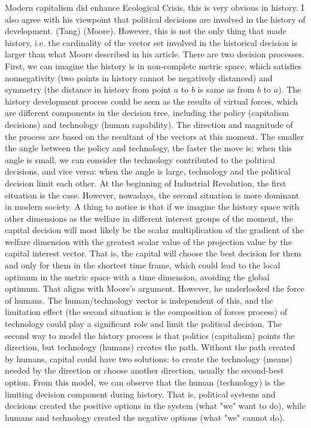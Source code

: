 \documentclass[12pt]{article}
\newcommand{\IR}{Industrial Revolution}
\newcommand{\EC}{Ecological Crisis}
\begin{document}
\begin{flushleft}
Modern capitalism did enhance \EC, this is very obvious in history. I also agree with his viewpoint that political decisions are involved in the history of development. (Tang) (Moore). However, this is not the only thing that made history, i.e. the cardinality of the vector set involved in the historical decision is larger than what Moore described in his article. There are two decision processes. First, we can imagine the history is in non-complete metric space, which satisfies nonnegativity (two points in history cannot be negatively distanced) and symmetry (the distance in history from point $a$ to $b$ is same as from $b$ to $a$).
The history development process could be seen as the results of virtual forces, which are different components in the decision tree, including the policy (capitalism decisions) and technology (human capability). The direction and magnitude of the process are based on the resultant of the vectors at this moment. The smaller the angle between the policy and technology, the faster the move is; when this angle is small, we can consider the technology contributed to the political decisions, and vice versa: when the angle is large, technology and the political decision limit each other.  At the beginning of \IR, the first situation is the case. However, nowadays, the second situation is more dominant in modern society. A thing to notice is that if we imagine the history space with other dimensions as the welfare in different interest groups of the moment, the capital decision will most likely be the scalar multiplication of the gradient of the welfare dimension with the greatest scalar value of the projection value by the capital interest vector. That is, the capital will choose the best decision for them and only for them in the shortest time frame, which could lead to the local optimum in the metric space with a time dimension, avoiding the global optimum.  
That aligns with Moore's argument. However, he underlooked the force of humans.
The human/technology vector is independent of this, and the limitation effect (the second situation is the composition of forces process) of technology could play a significant role and limit the political decision. 
The second way to model the history process is that politics (capitalism) points the direction, but technology (humans) creates the path. Without the path created by humans, capital could have two solutions: to create the technology (means) needed by the direction or choose another direction, usually the second-best option. From this model, we can observe that the human (technology) is the limiting decision component during history. That is, political systems and decisions created the positive options in the system (what "we" want to do), while humans and technology created the negative options (what "we" cannot do).


\end{flushleft}
\end{document}
